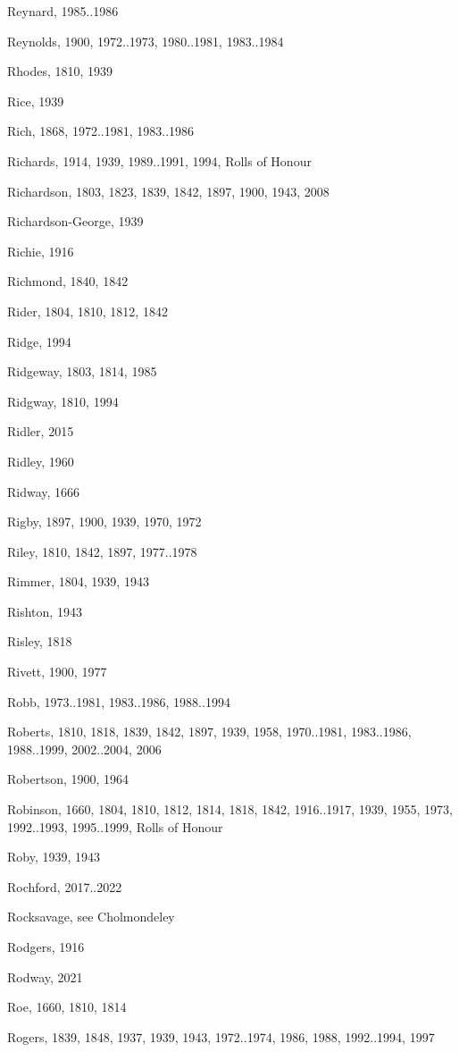 {\begin{theindex}
\item Reynard, 1985..1986
\item Reynolds, 1900, 1972..1973, 1980..1981, 1983..1984
\item Rhodes, 1810, 1939
\item Rice, 1939
\item Rich, 1868, 1972..1981, 1983..1986
\item Richards, 1914, 1939, 1989..1991, 1994, Rolls of Honour
\item Richardson, 1803, 1823, 1839, 1842, 1897, 1900, 1943, 2008
\item Richardson-George, 1939
\item Richie, 1916
\item Richmond, 1840, 1842
\item Rider, 1804, 1810, 1812, 1842
\item Ridge, 1994
\item Ridgeway, 1803, 1814, 1985
\item Ridgway, 1810, 1994
\item Ridler, 2015
\item Ridley, 1960
\item Ridway, 1666
\item Rigby, 1897, 1900, 1939, 1970, 1972
\item Riley, 1810, 1842, 1897, 1977..1978
\item Rimmer, 1804, 1939, 1943
\item Rishton, 1943
\item Risley, 1818
\item Rivett, 1900, 1977
\item Robb, 1973..1981, 1983..1986, 1988..1994
\item Roberts, 1810, 1818, 1839, 1842, 1897, 1939, 1958, 1970..1981, 1983..1986, 1988..1999, 2002..2004, 2006
\item Robertson, 1900, 1964
\item Robinson, 1660, 1804, 1810, 1812, 1814, 1818, 1842, 1916..1917, 1939, 1955, 1973, 1992..1993, 1995..1999, Rolls of Honour
\item Roby, 1939, 1943
\item Rochford, 2017..2022
\item Rocksavage, see Cholmondeley
\item Rodgers, 1916
\item Rodway, 2021
\item Roe, 1660, 1810, 1814
\item Rogers, 1839, 1848, 1937, 1939, 1943, 1972..1974, 1986, 1988, 1992..1994, 1997

\end{theindex}}
